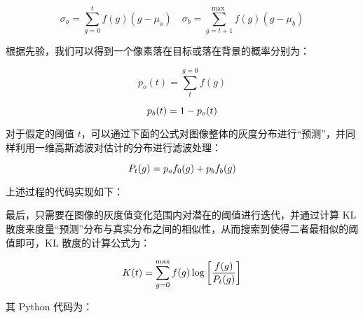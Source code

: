 \begin{equation}
\sigma_o=\sum_{g=0}^t f(g) \left(g-\mu_o\right)  \quad \sigma_b=\sum_{g=t+1}^{\text {max }} f(g) \left(g-\mu_b\right)
\end{equation}

根据先验，我们可以得到一个像素落在目标或落在背景的概率分别为：

\begin{equation}
p_o(t)=\sum_t^{g=0} f(g)
\end{equation}

\begin{equation}
p_b(t)=1-p_o(t)
\vspace{0.5cm}
\end{equation}

对于假定的阈值 $t$，可以通过下面的公式对图像整体的灰度分布进行“预测”，并同样利用一维高斯滤波对估计的分布进行滤波处理：

\begin{equation}
P_t(g)=p_o f_0(g)+p_b f_b(g)
\vspace{0.5cm}
\end{equation}

上述过程的代码实现如下：
\vspace{0.3cm}


最后，只需要在图像的灰度值变化范围内对潜在的阈值进行迭代，并通过计算 KL 散度来度量“预测”分布与真实分布之间的相似性，从而搜索到使得二者最相似的阈值即可，KL 散度的计算公式为：

\begin{equation}
K(t)=\sum_{g=0}^{\max } f(g) \log \left[\frac{f(g)}{P_t(g)}\right]
\vspace{0.5cm}
\end{equation}

其 Python 代码为：
\vspace{0.3cm}


